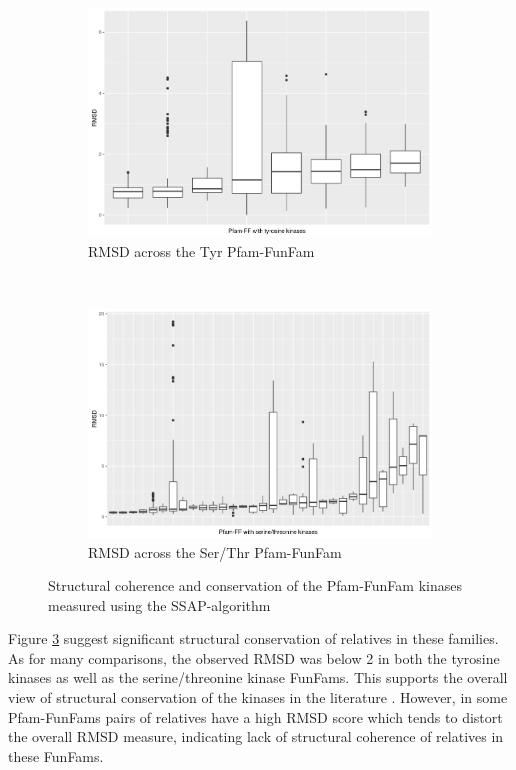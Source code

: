\documentclass[a4paper, 11pt]{report}
\begin{document}
\begin{figure}[H]
\centering
\begin{subfigure}{.8\textwidth}
  \centering
  \includegraphics[width=\linewidth]{figures/ssap_tyr.png}
  \caption{RMSD across the Tyr Pfam-FunFam}
  \label{ssap_tyr}
\end{subfigure}\\
\begin{subfigure}{.8\textwidth}
  \centering
  \includegraphics[width=\linewidth]{figures/ssap_ser.png}
    \caption{RMSD across the Ser/Thr Pfam-FunFam}
  \label{ssap_ser}
\end{subfigure}
\caption{Structural coherence and conservation of the Pfam-FunFam kinases measured using the SSAP-algorithm}
\label{ssap_measure}
\end{figure}
Figure \ref{ssap_measure} suggest significant structural conservation of relatives in these families. As for many comparisons, the observed RMSD was below 2 in both the tyrosine kinases as well as the serine/threonine kinase FunFams. This supports the overall view of structural conservation of the kinases in the literature \cite{manning2002protein, taylor2011protein, elkins2016comprehensive,roskoski2016classification}. However, in some Pfam-FunFams pairs of relatives have a high RMSD score which tends to distort the overall RMSD measure, indicating lack of structural coherence of relatives in these FunFams.\par
\end{document}
